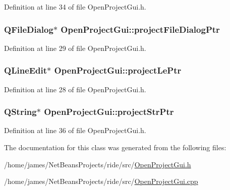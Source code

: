Definition at line 34 of file Open\-Project\-Gui.\-h.

\hypertarget{class_open_project_gui_a897656f67bf72dedd1fca9fe1291b28d}{
\subsubsection[{project\-File\-Dialog\-Ptr}]{\setlength{\rightskip}{0pt plus 5cm}Q\-File\-Dialog$\ast$ Open\-Project\-Gui\-::project\-File\-Dialog\-Ptr\hspace{0.3cm}{\ttfamily [private]}}}\label{class_open_project_gui_a897656f67bf72dedd1fca9fe1291b28d}


Definition at line 29 of file Open\-Project\-Gui.\-h.

\hypertarget{class_open_project_gui_ae36ed1a918868075f2cbadb359dafdbb}{
\subsubsection[{project\-Le\-Ptr}]{\setlength{\rightskip}{0pt plus 5cm}Q\-Line\-Edit$\ast$ Open\-Project\-Gui\-::project\-Le\-Ptr\hspace{0.3cm}{\ttfamily [private]}}}\label{class_open_project_gui_ae36ed1a918868075f2cbadb359dafdbb}


Definition at line 28 of file Open\-Project\-Gui.\-h.

\hypertarget{class_open_project_gui_aadab89933dc3fe2a0bbdb1f1b7e886b7}{
\subsubsection[{project\-Str\-Ptr}]{\setlength{\rightskip}{0pt plus 5cm}Q\-String$\ast$ Open\-Project\-Gui\-::project\-Str\-Ptr\hspace{0.3cm}{\ttfamily [private]}}}\label{class_open_project_gui_aadab89933dc3fe2a0bbdb1f1b7e886b7}


Definition at line 36 of file Open\-Project\-Gui.\-h.



The documentation for this class was generated from the following files\-:\begin{DoxyCompactItemize}
\item 
/home/james/\-Net\-Beans\-Projects/ride/src/\hyperlink{_open_project_gui_8h}{Open\-Project\-Gui.\-h}\item 
/home/james/\-Net\-Beans\-Projects/ride/src/\hyperlink{_open_project_gui_8cpp}{Open\-Project\-Gui.\-cpp}\end{DoxyCompactItemize}
